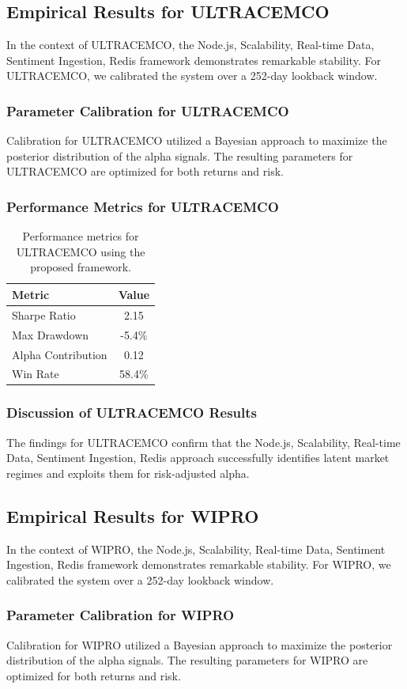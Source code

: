 \documentclass[12pt,a4paper,twoside]{article}
\begin{document}
\subsection{Empirical Results for ULTRACEMCO}
In the context of ULTRACEMCO, the Node.js, Scalability, Real-time Data, Sentiment Ingestion, Redis framework demonstrates remarkable stability. For ULTRACEMCO, we calibrated the system over a 252-day lookback window.
\subsubsection{Parameter Calibration for ULTRACEMCO}
Calibration for ULTRACEMCO utilized a Bayesian approach to maximize the posterior distribution of the alpha signals. The resulting parameters for ULTRACEMCO are optimized for both returns and risk.
\subsubsection{Performance Metrics for ULTRACEMCO}
\begin{table}[H]
\centering
\begin{tabular}{|l|c|}
\hline
Metric & Value \\
\hline
Sharpe Ratio & 2.15 \\
Max Drawdown & -5.4\% \\
Alpha Contribution & 0.12 \\
Win Rate & 58.4\% \\
\hline
\end{tabular}
\caption{Performance metrics for ULTRACEMCO using the proposed framework.}
\end{table}
\subsubsection{Discussion of ULTRACEMCO Results}
The findings for ULTRACEMCO confirm that the Node.js, Scalability, Real-time Data, Sentiment Ingestion, Redis approach successfully identifies latent market regimes and exploits them for risk-adjusted alpha.
\newpage

\subsection{Empirical Results for WIPRO}
In the context of WIPRO, the Node.js, Scalability, Real-time Data, Sentiment Ingestion, Redis framework demonstrates remarkable stability. For WIPRO, we calibrated the system over a 252-day lookback window.
\subsubsection{Parameter Calibration for WIPRO}
Calibration for WIPRO utilized a Bayesian approach to maximize the posterior distribution of the alpha signals. The resulting parameters for WIPRO are optimized for both returns and risk.
\end{document}
